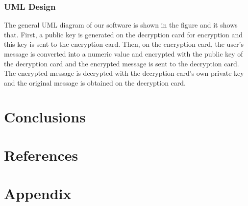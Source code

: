 \documentclass[12pt]{article}
\begin{document}
	\subsubsection{UML Design}
 	The general UML diagram of our software is shown in the figure and it shows that. First, a public key is generated on the decryption card for encryption and this key is sent to the encryption card. Then, on the encryption card, the user's message is converted into a numeric value and encrypted with the public key of the decryption card and the encrypted message is sent to the decryption card. The encrypted message is decrypted with the decryption card's own private key and the original message is obtained on the decryption card.
	\section{Conclusions}
	
	\section{References}
	
	\section{Appendix}


	
	
\end{document}
